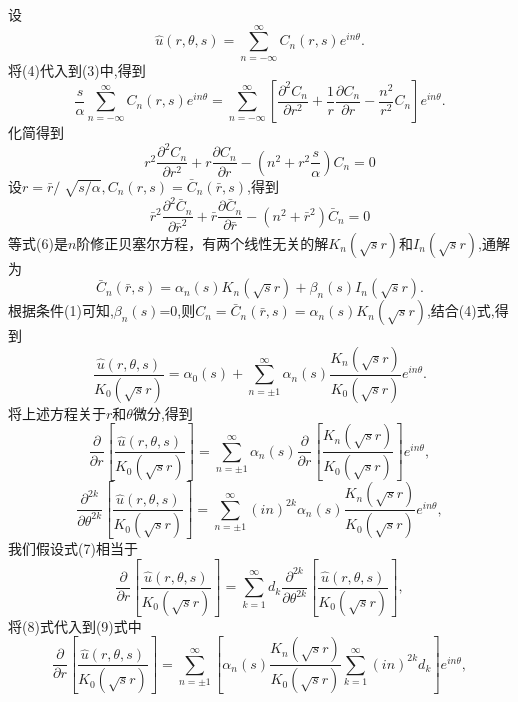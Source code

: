 \documentclass[a4paper,15pt,twoside,zihao=-4]{article}
\begin{document}
\indent 设
\begin{equation}
\displaystyle\hat{u}(r,\theta,s)=\sum_{n=-\infty }^{\infty } C_n(r,s)e^{in\theta}.
\end{equation}
\indent 将(4)代入到(3)中,得到
$$\frac{s}{\alpha}\sum_{n=-\infty }^{\infty } C_n(r,s)e^{in\theta}=
\sum_{n=-\infty }^{\infty }\left [\frac{\partial^2C_n}{\partial r^2}+\frac{1}{r}
\frac{\partial C_n}{\partial r}-\frac{n^2}{r^2}C_n \right ] e^{in\theta}.$$
\indent 化简得到\\
\begin{equation}
r^2\frac{\partial^2C_n}{\partial r^2}+r
\frac{\partial C_n}{\partial r}-(n^2+r^2\frac{s}{\alpha })C_n=0
\end{equation}
\indent 设$r=\bar{r}/\sqrt[]{s/\alpha} ,C_n(r,s)=\bar{C}_n(\bar{r},s)$,得到
\begin{equation}
\bar{r}^2\frac{\partial^2\bar{C}_n}{\partial \bar{r}^2}+\bar{r}
\frac{\partial \bar{C}_n}{\partial \bar{r}}-(n^2+\bar{r}^2)\bar{C}_n=0
\end{equation}
\indent 等式(6)是$n$阶修正贝塞尔方程，有两个线性无关的解$K_n(\sqrt{s}r)$和$I_n(\sqrt{s}r)$,通解为
$$\bar{C}_n(\bar{r},s)=\alpha_n(s)K_n(\sqrt{s}r)+\beta_n(s)I_n(\sqrt{s}r).$$
\indent 根据条件(1)可知,$\beta_n(s)$=0,则$C_n=\bar{C}_n(\bar{r},s)=\alpha_n(s)K_n(\sqrt{s}r)$,结合(4)式,得到
$$\frac{\hat{u}(r,\theta,s)}{K_0(\sqrt{s}r)}=\alpha_0(s)+\sum_{n=\pm 1}^{\infty}
\alpha_n(s)\frac{K_n(\sqrt{s}r)}{K_0(\sqrt{s}r)}e^{in\theta}.$$
\indent 将上述方程关于$r$和$\theta$微分,得到
\begin{equation}
\frac{\partial }{\partial r}\left[\frac{\hat{u}(r,\theta,s) }{K_0(\sqrt{s}r )} \right ]=
\sum_{n=\pm 1}^{\infty}\alpha_n(s)
\frac{\partial }{\partial r}\left[\frac{K_n(\sqrt{s}r )}{K_0(\sqrt{s}r )} \right ]e^{in\theta},
\end{equation}
\begin{equation}
\frac{\partial^{2k} }{\partial \theta^{2k}}\left[\frac{\hat{u}(r,\theta,s) }{K_0(\sqrt{s}r )} \right ]=
\sum_{n=\pm 1}^{\infty}(in)^{2k}\alpha_n(s)
\frac{K_n(\sqrt{s}r )}{K_0(\sqrt{s}r )}e^{in\theta},
\end{equation}
\indent 我们假设式(7)相当于
\begin{equation}
\frac{\partial }{\partial r}\left[\frac{\hat{u}(r,\theta,s) }{K_0(\sqrt{s}r )} \right ]=
\sum_{k=1}^{\infty}d_k
\frac{\partial^{2k} }{\partial \theta^{2k}}\left[\frac{\hat{u}(r,\theta,s) }{K_0(\sqrt{s}r )} \right ],
\end{equation}
\indent 将(8)式代入到(9)式中
\begin{equation}
\frac{\partial }{\partial r}\left[\frac{\hat{u}(r,\theta,s) }{K_0(\sqrt{s}r )} \right ]=
\sum_{n=\pm 1}^{\infty }\left [\alpha_n(s)\frac{K_n(\sqrt{s}r )}{K_0(\sqrt{s}r )}
\sum_{k=1}^{\infty}(in)^{2k}d_k\right ]e^{in\theta},
\end{equation}
\end{document}
